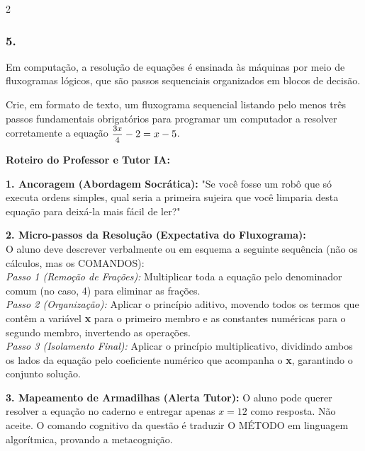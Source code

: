\begin{multicols*}{2}
\subsubsection*{5.} 
\begin{enunciadoLiteral}
Em computação, a resolução de equações é ensinada às máquinas por meio de fluxogramas lógicos, que são passos sequenciais organizados em blocos de decisão. 

Crie, em formato de texto, um fluxograma sequencial listando pelo menos três passos fundamentais obrigatórios para programar um computador a resolver corretamente a equação $\mfrac{3x}{4} - 2 = x - 5$.
\end{enunciadoLiteral}

\ifgabarito
    \begin{tcolorbox}[colback=CorTitUm!5, colframe=CorTitUm, boxrule=1pt, arc=4pt, left=6pt, right=6pt, top=6pt, bottom=6pt]
    \small\textbf{\textcolor{CorTitUm}{Roteiro do Professor e Tutor IA:}}\par\vspace{0.1cm}
    \color{CinzaEscuro}
    \textbf{1. Ancoragem (Abordagem Socrática):} "Se você fosse um robô que só executa ordens simples, qual seria a primeira sujeira que você limparia desta equação para deixá-la mais fácil de ler?"\par\vspace{0.1cm}
    
    \textbf{2. Micro-passos da Resolução (Expectativa do Fluxograma):}\\
    O aluno deve descrever verbalmente ou em esquema a seguinte sequência (não os cálculos, mas os COMANDOS):\\
    \textit{Passo 1 (Remoção de Frações):} Multiplicar toda a equação pelo denominador comum (no caso, 4) para eliminar as frações.\\
    \textit{Passo 2 (Organização):} Aplicar o princípio aditivo, movendo todos os termos que contêm a variável \textbf{x} para o primeiro membro e as constantes numéricas para o segundo membro, invertendo as operações.\\
    \textit{Passo 3 (Isolamento Final):} Aplicar o princípio multiplicativo, dividindo ambos os lados da equação pelo coeficiente numérico que acompanha o \textbf{x}, garantindo o conjunto solução.\par\vspace{0.1cm}
    
    \textbf{3. Mapeamento de Armadilhas (Alerta Tutor):} O aluno pode querer resolver a equação no caderno e entregar apenas $x = 12$ como resposta. Não aceite. O comando cognitivo da questão é traduzir O MÉTODO em linguagem algorítmica, provando a metacognição.
    

\end{tcolorbox}
\end{multicols*}
